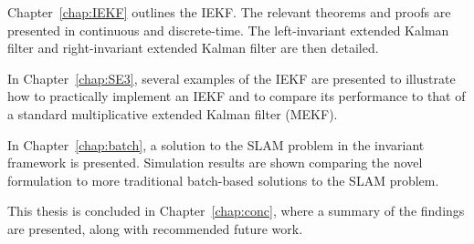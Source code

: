 Chapter~\ref{chap:IEKF} outlines the IEKF. The relevant theorems and proofs are presented in continuous and discrete-time. The left-invariant extended Kalman filter and right-invariant extended Kalman filter are then detailed.

In Chapter~\ref{chap:SE3}, several examples of the IEKF are presented to illustrate how to practically implement an IEKF and to compare its performance to that of a standard multiplicative extended Kalman filter (MEKF). 

In Chapter~\ref{chap:batch}, a solution to the SLAM problem in the invariant framework is presented. Simulation results are shown comparing the novel formulation to more traditional batch-based solutions to the SLAM problem.

This thesis is concluded in Chapter~\ref{chap:conc}, where a summary of the findings are presented, along with recommended future work.


